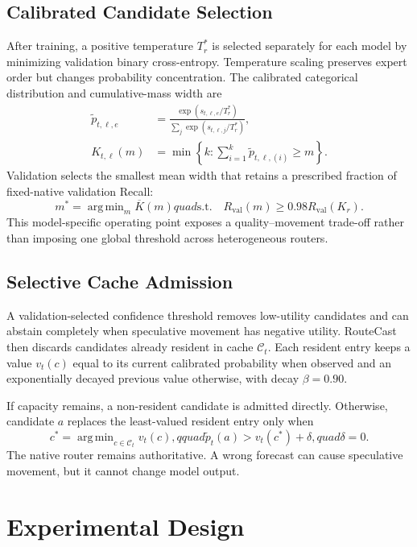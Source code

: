 \documentclass[conference]{IEEEtran}
\DeclareMathOperator*{\argmin}{arg\,min}
\begin{document}
\subsection{Calibrated Candidate Selection}
After training, a positive temperature $T_r^*$ is selected separately for each model by minimizing validation binary cross-entropy. Temperature scaling preserves expert order but changes probability concentration. The calibrated categorical distribution and cumulative-mass width are
\begin{align}
\tilde p_{t,\ell,e}
&=\frac{\exp(s_{t,\ell,e}/T_r^*)}{\sum_j\exp(s_{t,\ell,j}/T_r^*)},\\
K_{t,\ell}(m)
&=\min\left\{k:\sum_{i=1}^{k}\tilde p_{t,\ell,(i)}\ge m\right\}.
\label{eq:adaptive-width}
\end{align}
Validation selects the smallest mean width that retains a prescribed fraction of fixed-native validation Recall:
\begin{equation}
m^*=\argmin_m\overline{K}(m)quad
\mathrm{s.t.}\quad R_{\mathrm{val}}(m)\ge
0.98R_{\mathrm{val}}(K_r).
\label{eq:mass-selection}
\end{equation}
This model-specific operating point exposes a quality--movement trade-off rather than imposing one global threshold across heterogeneous routers.

\subsection{Selective Cache Admission}
A validation-selected confidence threshold removes low-utility candidates and can abstain completely when speculative movement has negative utility. RouteCast then discards candidates already resident in cache $\mathcal{C}_t$. Each resident entry keeps a value $v_t(c)$ equal to its current calibrated probability when observed and an exponentially decayed previous value otherwise, with decay $\beta=0.90$.

If capacity remains, a non-resident candidate is admitted directly. Otherwise, candidate $a$ replaces the least-valued resident entry only when
\begin{equation}
c^*=\argmin_{c\in\mathcal{C}_t}v_t(c),qquad
\tilde p_t(a)>v_t(c^*)+\delta,quad \delta=0.
\label{eq:cache-admission}
\end{equation}
The native router remains authoritative. A wrong forecast can cause speculative movement, but it cannot change model output.

\section{Experimental Design}
\end{document}
